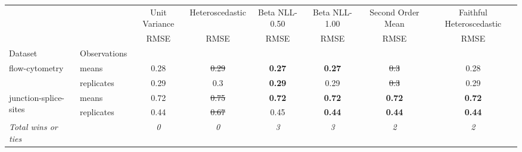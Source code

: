 \begin{tabular}{ll|c|c|c|c|c|c}
\toprule
{} & {} & {Unit Variance} & {Heteroscedastic} & {Beta NLL-0.50} & {Beta NLL-1.00} & {Second Order Mean} & {Faithful Heteroscedastic} \\
{} & {} & {RMSE} & {RMSE} & {RMSE} & {RMSE} & {RMSE} & {RMSE} \\
{Dataset} & {Observations} & {} & {} & {} & {} & {} & {} \\
\midrule
\multirow[t]{2}{*}{flow-cytometry} & means & 0.28 & \sout{0.29} & \textbf{0.27} & \textbf{0.27} & \sout{0.3} & 0.28 \\
 & replicates & 0.29 & 0.3 & \textbf{0.29} & 0.29 & \sout{0.3} & 0.29 \\
\multirow[t]{2}{*}{junction-splice-sites} & means & 0.72 & \sout{0.75} & \textbf{0.72} & \textbf{0.72} & \textbf{0.72} & \textbf{0.72} \\
 & replicates & 0.44 & \sout{0.67} & 0.45 & \textbf{0.44} & \textbf{0.44} & \textbf{0.44} \\
\textit{{Total wins or ties}} &  & \textit{0} & \textit{0} & \textit{3} & \textit{3} & \textit{2} & \textit{2} \\
\bottomrule
\end{tabular}

